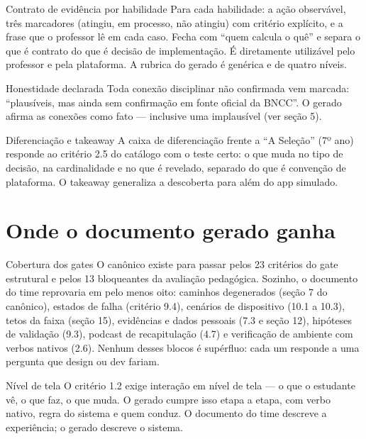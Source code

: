\documentclass[11pt,a4paper]{article}
\begin{document}
\begin{creditobox}{Contrato de evidência por habilidade}
Para cada habilidade: a ação observável, três marcadores (atingiu, em processo, não atingiu) com critério explícito, e a frase que o professor lê em cada caso. Fecha com ``quem calcula o quê'' e separa o que é contrato do que é decisão de implementação. É diretamente utilizável pelo professor e pela plataforma. A rubrica do gerado é genérica e de quatro níveis.
\end{creditobox}

\begin{creditobox}{Honestidade declarada}
Toda conexão disciplinar não confirmada vem marcada: ``plausíveis, mas ainda sem confirmação em fonte oficial da BNCC''. O gerado afirma as conexões como fato --- inclusive uma implausível (ver seção 5).
\end{creditobox}

\begin{creditobox}{Diferenciação e takeaway}
A caixa de diferenciação frente a ``A Seleção'' (7º ano) responde ao critério 2.5 do catálogo com o teste certo: o que muda no tipo de decisão, na cardinalidade e no que é revelado, separado do que é convenção de plataforma. O takeaway generaliza a descoberta para além do app simulado.
\end{creditobox}

\section{Onde o documento gerado ganha}

\begin{creditobox}{Cobertura dos gates}
O canônico existe para passar pelos 23 critérios do gate estrutural e pelos 13 bloqueantes da avaliação pedagógica. Sozinho, o documento do time reprovaria em pelo menos oito: caminhos degenerados (seção 7 do canônico), estados de falha (critério 9.4), cenários de dispositivo (10.1 a 10.3), tetos da faixa (seção 15), evidências e dados pessoais (7.3 e seção 12), hipóteses de validação (9.3), podcast de recapitulação (4.7) e verificação de ambiente com verbos nativos (2.6). Nenhum desses blocos é supérfluo: cada um responde a uma pergunta que design ou dev fariam.
\end{creditobox}

\begin{creditobox}{Nível de tela}
O critério 1.2 exige interação em nível de tela --- o que o estudante vê, o que faz, o que muda. O gerado cumpre isso etapa a etapa, com verbo nativo, regra do sistema e quem conduz. O documento do time descreve a experiência; o gerado descreve o sistema.
\end{creditobox}
\end{document}
